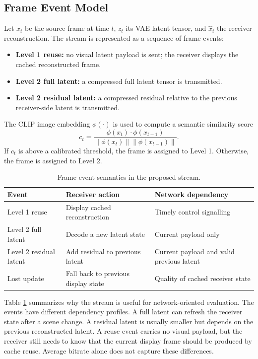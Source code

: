 \documentclass[conference]{IEEEtran}
\begin{document}
\subsection{Frame Event Model}

Let $x_t$ be the source frame at time $t$, $z_t$ its VAE latent tensor, and $\hat{x}_t$ the receiver reconstruction. The stream is represented as a sequence of frame events:
\begin{itemize}
    \item \textbf{Level 1 reuse:} no visual latent payload is sent; the receiver displays the cached reconstructed frame.
    \item \textbf{Level 2 full latent:} a compressed full latent tensor is transmitted.
    \item \textbf{Level 2 residual latent:} a compressed residual relative to the previous receiver-side latent is transmitted.
\end{itemize}

The CLIP image embedding $\phi(\cdot)$ is used to compute a semantic similarity score
\begin{equation}
    c_t = \frac{\phi(x_t)\cdot \phi(x_{t-1})}{\|\phi(x_t)\|\|\phi(x_{t-1})\|}.
\end{equation}
If $c_t$ is above a calibrated threshold, the frame is assigned to Level 1. Otherwise, the frame is assigned to Level 2.

\begin{table}[t]
\caption{Frame event semantics in the proposed stream.}
\label{tab:events}
\centering
\scriptsize
\setlength{\tabcolsep}{2pt}
\begin{tabular}{@{}p{}p{}p{}@{}}
\toprule
Event & Receiver action & Network dependency \\
\midrule
Level 1 reuse & Display cached reconstruction & Timely control signalling \\
Level 2 full latent & Decode a new latent state & Current payload only \\
Level 2 residual latent & Add residual to previous latent & Current payload and valid previous latent \\
Lost update & Fall back to previous display state & Quality of cached receiver state \\
\bottomrule
\end{tabular}
\end{table}

Table \ref{tab:events} summarizes why the stream is useful for network-oriented evaluation. The events have different dependency profiles. A full latent can refresh the receiver state after a scene change. A residual latent is usually smaller but depends on the previous reconstructed latent. A reuse event carries no visual payload, but the receiver still needs to know that the current display frame should be produced by cache reuse. Average bitrate alone does not capture these differences.
\end{document}
